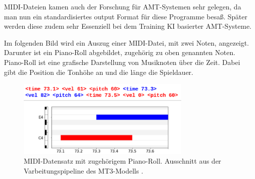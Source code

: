 \begin{description}[style=nextline]
MIDI-Dateien kamen auch der Forschung für AMT-Systemen sehr gelegen,
da man nun ein standardisiertes output Format für diese Programme besaß.
Später werden diese zudem sehr Essenziell bei dem Training KI basierter AMT-Systeme.
\cite{telila2025cnn}
\end{description}

Im folgenden Bild wird ein Auszug einer MIDI-Datei, mit zwei Noten, angezeigt.
Darunter ist ein Piano-Roll abgebildet, zugehörig zu oben genannten Noten.
Piano-Roll ist eine grafische Darstellung von Musiknoten über die Zeit.
Dabei gibt die Position die Tonhöhe an und die länge die Spieldauer.
\begin{figure}[H]
    \centering
    \includegraphics[width=0.75\textwidth]{Graphics/midi_pianoroll}
    \caption[MIDI-Datensatz]{MIDI-Datensatz mit zugehörigem Piano-Roll. Ausschnitt aus der Varbeitungspipeline des MT3-Modells \cite{mt3colab}.}
    \label{fig:mt3_output_tokens}
\end{figure}

